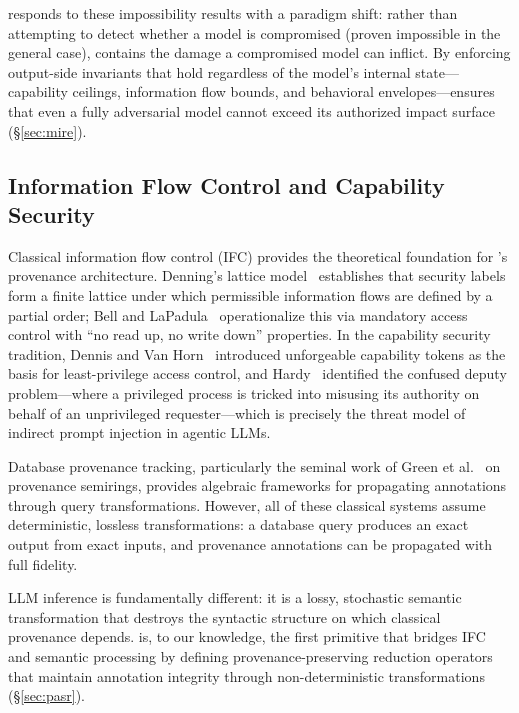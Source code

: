 \mire responds to these impossibility results with a paradigm shift: rather than attempting to detect whether a model is compromised (proven impossible in the general case), \mire contains the damage a compromised model can inflict. By enforcing output-side invariants that hold regardless of the model's internal state---capability ceilings, information flow bounds, and behavioral envelopes---\mire ensures that even a fully adversarial model cannot exceed its authorized impact surface (\S\ref{sec:mire}).

\subsection{Information Flow Control and Capability Security}
\label{sec:related:ifc}

Classical information flow control (IFC) provides the theoretical foundation for \sentinel's provenance architecture. Denning's lattice model~\cite{denning1976} establishes that security labels form a finite lattice under which permissible information flows are defined by a partial order; Bell and LaPadula~\cite{belllapadula1973} operationalize this via mandatory access control with ``no read up, no write down'' properties. In the capability security tradition, Dennis and Van Horn~\cite{dennis1966} introduced unforgeable capability tokens as the basis for least-privilege access control, and Hardy~\cite{hardy1988} identified the confused deputy problem---where a privileged process is tricked into misusing its authority on behalf of an unprivileged requester---which is precisely the threat model of indirect prompt injection in agentic LLMs.

Database provenance tracking, particularly the seminal work of Green et al.~\cite{green2007} on provenance semirings, provides algebraic frameworks for propagating annotations through query transformations. However, all of these classical systems assume deterministic, lossless transformations: a database query produces an exact output from exact inputs, and provenance annotations can be propagated with full fidelity.

LLM inference is fundamentally different: it is a lossy, stochastic semantic transformation that destroys the syntactic structure on which classical provenance depends. \pasr is, to our knowledge, the first primitive that bridges IFC and semantic processing by defining provenance-preserving reduction operators that maintain annotation integrity through non-deterministic transformations (\S\ref{sec:pasr}).

